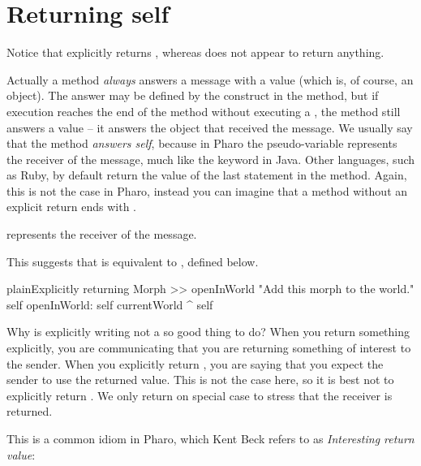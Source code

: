 \documentclass[10pt,twoside,english]{_support/latex/sbabook/sbabook}
\begin{document}
\section{Returning self}
Notice that  explicitly returns ,
whereas  does not appear to return anything.

Actually a method \textit{always} answers a message with a value (which is, of
course, an object). The answer may be defined by the \textcode{\string^} construct in the
method, but if execution reaches the end of the method without executing a
\textcode{\string^}, the method still answers a value -- it answers the object that
received the message. We usually say that the method \textit{answers self}, because
in Pharo the pseudo-variable  represents the receiver of the message,
much like the keyword  in Java. Other languages, such as Ruby, by
default return the value of the last statement in the method. Again, this is not
the case in Pharo, instead you can imagine that a method without an explicit
return ends with .

\begin{important}
 represents the receiver of the message.
\end{important}

This suggests that  is equivalent to ,
defined below.

\begin{listing}[float, label=scr:openInWorldReturnSelf]{plain}{Explicitly returning }
Morph >> openInWorld
    "Add this morph to the world."
    self openInWorld: self currentWorld
    ^ self
\end{listing}

Why is explicitly writing  not a so good thing to do? When you
return something explicitly, you are communicating that you are returning
something of interest to the sender. When you explicitly return , you
are saying that you expect the sender to use the returned value. This is not the
case here, so it is best not to explicitly return . We only return 
on special case to stress that the receiver is returned.

This is a common idiom in Pharo, which Kent Beck refers to as \textit{Interesting
return value}:
\end{document}
